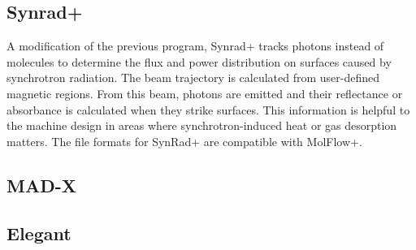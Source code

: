 \subsection{Synrad+}

A modification of the previous program, Synrad+ tracks photons instead of molecules to determine the flux and power distribution on surfaces caused by synchrotron radiation.  The beam trajectory is calculated from user-defined magnetic regions.  From this beam, photons are emitted and their reflectance or absorbance is calculated when they strike surfaces. This information is helpful to the machine design in areas where synchrotron-induced heat or gas desorption matters.  The file formats for SynRad+ are compatible with MolFlow+.

\subsection{MAD-X}

\subsection{Elegant}
